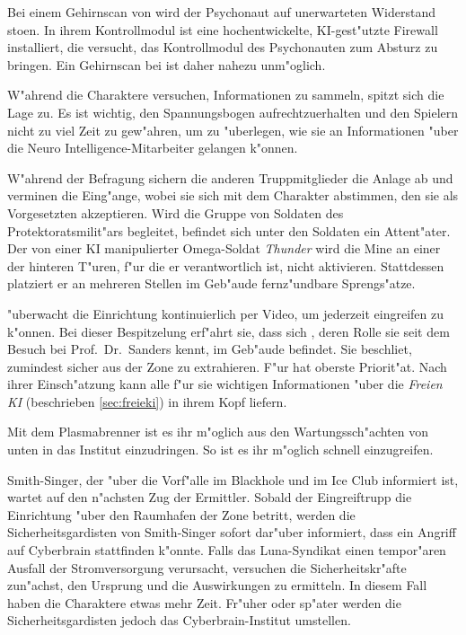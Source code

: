 Bei einem Gehirnscan von \ml{} wird der Psychonaut auf unerwarteten Widerstand sto\3en. In ihrem Kontrollmodul ist eine hochentwickelte, KI-gest"utzte Firewall installiert, die versucht, das Kontrollmodul des Psychonauten zum Absturz zu bringen. Ein Gehirnscan bei \ml{} ist daher nahezu unm"oglich.

\begin{remarks}
	W"ahrend die Charaktere versuchen, Informationen zu sammeln, spitzt sich die Lage zu. Es ist wichtig, den Spannungsbogen aufrechtzuerhalten und den Spielern nicht zu viel Zeit zu gew"ahren, um zu "uberlegen, wie sie an Informationen "uber die Neuro Intelligence-Mitarbeiter gelangen k"onnen.
\end{remarks}

W"ahrend der Befragung sichern die anderen Truppmitglieder die Anlage ab und verminen die Eing"ange, wobei sie sich mit dem Charakter abstimmen, den sie als Vorgesetzten akzeptieren. Wird die Gruppe von Soldaten des Protektoratsmilit"ars begleitet, befindet sich unter den Soldaten ein Attent"ater. Der von einer KI manipulierter Omega-Soldat \emph{Thunder} wird die Mine an einer der hinteren T"uren, f"ur die er verantwortlich ist, nicht aktivieren. Stattdessen platziert er an mehreren Stellen im Geb"aude fernz"undbare Sprengs"atze.

\xl{} "uberwacht die Einrichtung kontinuierlich per Video, um jederzeit eingreifen zu k"onnen. Bei dieser Bespitzelung erf"ahrt sie, dass sich \ml{}, deren Rolle sie seit dem Besuch bei Prof.~Dr.~Sanders kennt, im Geb"aude befindet. Sie beschlie\3t, zumindest \ml{} sicher aus der Zone zu extrahieren. F"ur \xl{} hat \ml{} oberste Priorit"at. Nach ihrer Einsch"atzung kann \ml{} alle f"ur sie wichtigen Informationen "uber die \emph{Freien KI} (beschrieben \cref{sec:freieki}) in ihrem Kopf liefern.

Mit dem Plasmabrenner ist es ihr m"oglich aus den Wartungssch"achten von unten in das Institut einzudringen. So ist es ihr m"oglich schnell einzugreifen.

Smith-Singer, der "uber die Vorf"alle im Blackhole und im Ice Club informiert ist, wartet auf den n"achsten Zug der Ermittler. Sobald der Eingreiftrupp die Einrichtung "uber den Raumhafen der Zone betritt, werden die Sicherheitsgardisten von Smith-Singer sofort dar"uber informiert, dass ein Angriff auf Cyberbrain stattfinden k"onnte. Falls das Luna-Syndikat einen tempor"aren Ausfall der Stromversorgung verursacht, versuchen die Sicherheitskr"afte zun"achst, den Ursprung und die Auswirkungen zu ermitteln. In diesem Fall haben die Charaktere etwas mehr Zeit. Fr"uher oder sp"ater werden die Sicherheitsgardisten jedoch das Cyberbrain-Institut umstellen. 

